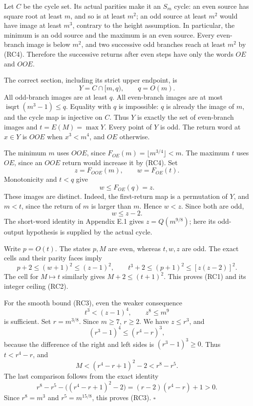 \documentclass[12pt]{article}
\begin{document}
Let \(C\) be the cycle set. Its actual parities make it an \(S_m\)
cycle: an even source has square root at least \(m\), and so is at least
\(m^2\); an odd source at least \(m^2\) would have image at least
\(m^3\), contrary to the height assumption. In particular, the minimum
is an odd source and the maximum is an even source. Every even-branch
image is below \(m^2\), and two successive odd branches reach at least
\(m^2\) by (RC4). Therefore the successive returns after even steps have
only the words \(OE\) and \(OOE\).

The correct section, including its strict upper endpoint, is \[
Y=C\cap[m,q),\qquad q=O(m).
\] All odd-branch images are at least \(q\). All even-branch images are
at most \(\operatorname{isqrt}(m^3-1)\le q\). Equality with \(q\) is
impossible: \(q\) is already the image of \(m\), and the cycle map is
injective on \(C\). Thus \(Y\) is exactly the set of even-branch images
and \(t=E(M)=\max Y\). Every point of \(Y\) is odd. The return word at
\(x\in Y\) is \(OOE\) when \(x^3<m^4\), and \(OE\) otherwise.

The minimum \(m\) uses \(OOE\), since
\(F_{OE}(m)=\lfloor m^{3/4}\rfloor<m\). The maximum \(t\) uses \(OE\),
since an \(OOE\) return would increase it by (RC4). Set \[
z=F_{OOE}(m),\qquad w=F_{OE}(t).
\] Monotonicity and \(t<q\) give \[
w\le F_{OE}(q)=z.
\] These images are distinct. Indeed, the first-return map is a
permutation of \(Y\), and \(m<t\), since the return of \(m\) is larger
than \(m\). Hence \(w<z\). Since both are odd, \[
w\le z-2. \tag{RC5}
\] The short-word identity in Appendix E.1 gives \(z=Q(m^{9/8})\); here
its odd-output hypothesis is supplied by the actual cycle.

Write \(p=O(t)\). The states \(p,M\) are even, whereas \(t,w,z\) are
odd. The exact cells and their parity faces imply \[
p+2\le(w+1)^2\le(z-1)^2,\qquad
t^3+2\le(p+1)^2\le[z(z-2)]^2.
\] The cell for \(M\mapsto t\) similarly gives \(M+2\le(t+1)^2\). This
proves (RC1) and its integer ceiling (RC2).

For the smooth bound (RC3), even the weaker consequence \[
t^3<(z-1)^4,\qquad z^8\le m^9
\] is sufficient. Set \(r=m^{3/8}\). Since \(m\ge7\), \(r\ge2\). We have
\(z\le r^3\), and \[
(r^3-1)^4\le(r^4-r)^3,
\] because the difference of the right and left sides is
\((r^3-1)^3\ge0\). Thus \(t<r^4-r\), and \[
M<(r^4-r+1)^2-2<r^8-r^5.
\] The last comparison follows from the exact identity \[
r^8-r^5-\bigl((r^4-r+1)^2-2\bigr)
=(r-2)(r^4-r)+1>0.
\] Since \(r^8=m^3\) and \(r^5=m^{15/8}\), this proves (RC3).
\(\square\)
\end{document}
